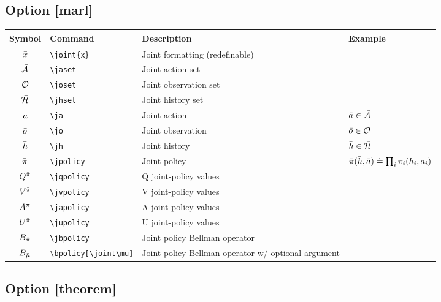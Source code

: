 \documentclass{article}
\begin{document}
\subsection*{Option [marl]}

\begin{tabular}{clll}
  \toprule
  Symbol & Command & Description & Example \\
  \midrule
  $\joint{x}$ & \verb|\joint{x}| & Joint formatting (redefinable) \\
  \midrule
  $\jaset$ & \verb|\jaset| & Joint action set \\
  $\joset$ & \verb|\joset| & Joint observation set \\
  $\jhset$ & \verb|\jhset| & Joint history set \\
  \midrule
  $\ja$ & \verb|\ja| & Joint action & $\ja\in\jaset$ \\
  $\jo$ & \verb|\jo| & Joint observation & $\jo\in\joset$ \\
  $\jh$ & \verb|\jh| & Joint history & $\jh\in\jhset$ \\
  \midrule
  $\jpolicy$ & \verb|\jpolicy| & Joint policy & $\jpolicy(\jh, \ja) \doteq \prod_i \policy_i(h_i, a_i)$ \\
  \midrule
  $\jqpolicy$ & \verb|\jqpolicy| & Q joint-policy values \\
  $\jvpolicy$ & \verb|\jvpolicy| & V joint-policy values \\
  $\japolicy$ & \verb|\japolicy| & A joint-policy values \\
  $\jupolicy$ & \verb|\jupolicy| & U joint-policy values \\
  \midrule
  $\jbpolicy$ & \verb|\jbpolicy| & Joint policy Bellman operator \\
  $\jbpolicy[\joint\mu]$ & \verb|\bpolicy[\joint\mu]| & Joint policy Bellman operator w/ optional argument \\
  \bottomrule
\end{tabular}

\subsection*{Option [theorem]}
\end{document}
